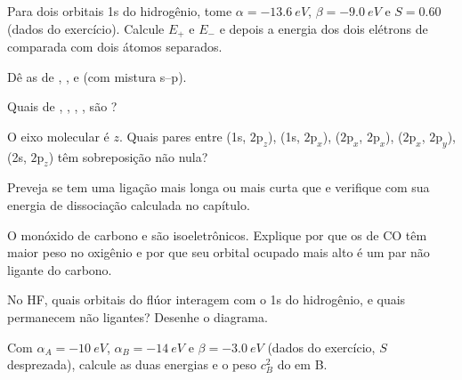 \begin{exercise}[$\star$]\label{exo:b2:diatomic-mos:1}
Para dois orbitais 1s do hidrogênio, tome $\alpha = \qty{-13.6}{eV}$, $\beta = \qty{-9.0}{eV}$ e
$S = 0.60$ (dados do exercício). Calcule $E_+$ e $E_-$ e depois a energia dos
dois elétrons de  comparada com dois átomos separados.
\end{exercise}

\begin{exercise}[$\star$]\label{exo:b2:diatomic-mos:2}
Dê as  de , ,  e  (com mistura
s--p).
\end{exercise}

\begin{exercise}[$\star$]\label{exo:b2:diatomic-mos:3}
Quais de , , , ,  são ?
\end{exercise}

\begin{exercise}[$\star$]\label{exo:b2:diatomic-mos:4}
O eixo molecular é $z$. Quais pares entre (1s, $2\mathrm p_z$), (1s,
$2\mathrm p_x$), ($2\mathrm p_x$, $2\mathrm p_x$), ($2\mathrm p_x$, $2\mathrm p_y$),
(2s, $2\mathrm p_z$) têm sobreposição não nula?
\end{exercise}

\begin{exercise}[$\star\star$]\label{exo:b2:diatomic-mos:5}
Preveja se  tem uma ligação mais longa ou mais curta que  e
verifique com sua energia de dissociação calculada no capítulo.
\end{exercise}

\begin{exercise}[$\star\star$]\label{exo:b2:diatomic-mos:6}
O monóxido de carbono e  são isoeletrônicos. Explique por que os  de CO têm maior peso no oxigênio e por que seu orbital ocupado mais
alto é um par não ligante do carbono.
\end{exercise}

\begin{exercise}[$\star\star$]\label{exo:b2:diatomic-mos:7}
No HF, quais orbitais do flúor interagem com o 1s do hidrogênio, e quais
permanecem não ligantes? Desenhe o diagrama.
\end{exercise}

\begin{exercise}[$\star\star$]\label{exo:b2:diatomic-mos:8}
Com $\alpha_A = \qty{-10}{eV}$, $\alpha_B = \qty{-14}{eV}$ e $\beta = \qty{-3.0}{eV}$
(dados do exercício, $S$ desprezada), calcule as duas energias e o peso $c_B^2$
do  em B.
\end{exercise}

